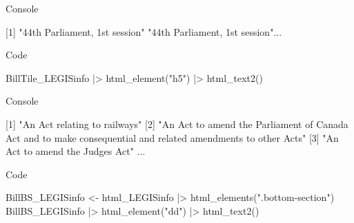 \documentclass[
  letterpaper,
  DIV=11,
  numbers=noendperiod]{scrreprt}
\newenvironment{Shaded}{\begin{snugshade}}{\end{snugshade}}
\newcommand{\ExtensionTok}[1]{\textcolor[rgb]{0.00,0.23,0.31}{#1}}
\newcommand{\KeywordTok}[1]{\textcolor[rgb]{0.00,0.23,0.31}{#1}}
\newcommand{\NormalTok}[1]{\textcolor[rgb]{0.00,0.23,0.31}{#1}}
\newcommand{\OperatorTok}[1]{\textcolor[rgb]{0.37,0.37,0.37}{#1}}
\newcommand{\StringTok}[1]{\textcolor[rgb]{0.13,0.47,0.30}{#1}}
\begin{document}
Console

\begin{Shaded}
\begin{Highlighting}[]
\ExtensionTok{[1]} \StringTok{"44th Parliament, 1st session"} \StringTok{"44th Parliament, 1st session"}\NormalTok{...}
\end{Highlighting}
\end{Shaded}

Code

\begin{Shaded}
\begin{Highlighting}[]
\ExtensionTok{BillTile\_LEGISinfo} \KeywordTok{|}\OperatorTok{\textgreater{}}\NormalTok{ html\_element}\KeywordTok{(}\StringTok{"h5"}\KeywordTok{)} \KeywordTok{|}\OperatorTok{\textgreater{}}\NormalTok{ html\_text2}\KeywordTok{()}
\end{Highlighting}
\end{Shaded}

Console

\begin{Shaded}
\begin{Highlighting}[]
\ExtensionTok{[1]} \StringTok{"An Act relating to railways"}                                                                                                                                                                                                                                                                                  
 \ExtensionTok{[2]} \StringTok{"An Act to amend the Parliament of Canada Act and to make consequential and related amendments to other Acts"}                                                                                                                                                                                                  
 \ExtensionTok{[3]} \StringTok{"An Act to amend the Judges Act"}   
\ExtensionTok{...}
\end{Highlighting}
\end{Shaded}

Code

\begin{Shaded}
\begin{Highlighting}[]
\ExtensionTok{BillBS\_LEGISinfo} \OperatorTok{\textless{}}\NormalTok{{-} html\_LEGISinfo }\KeywordTok{|}\OperatorTok{\textgreater{}}\NormalTok{ html\_elements}\KeywordTok{(}\StringTok{".bottom{-}section"}\KeywordTok{)}
\ExtensionTok{BillBS\_LEGISinfo} \KeywordTok{|}\OperatorTok{\textgreater{}}\NormalTok{ html\_element}\KeywordTok{(}\StringTok{"dd"}\KeywordTok{)} \KeywordTok{|}\OperatorTok{\textgreater{}}\NormalTok{ html\_text2}\KeywordTok{()}
\end{Highlighting}
\end{Shaded}
\end{document}

